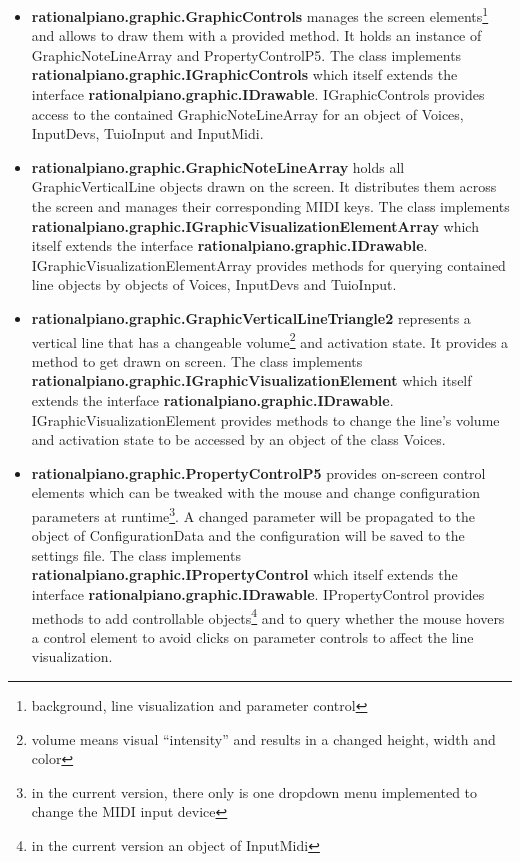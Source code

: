 \documentclass[12pt,a4paper,titlepage,oneside]{report}
\begin{document}
\begin{itemize}
	\item \textbf{rationalpiano.graphic.GraphicControls} manages the screen elements\footnote{background, line visualization and parameter control} and allows to draw them with a provided method. It holds an instance of GraphicNoteLineArray and PropertyControlP5. The class implements \textbf{rationalpiano.graphic.IGraphicControls} which itself extends the interface \textbf{rationalpiano.graphic.IDrawable}. IGraphicControls provides access to the contained GraphicNoteLineArray for an object of Voices, InputDevs, TuioInput and InputMidi.

	\item \textbf{rationalpiano.graphic.GraphicNoteLineArray} holds all GraphicVerticalLine objects drawn on the screen. It distributes them across the screen and manages their corresponding MIDI keys. The class implements \textbf{rationalpiano.graphic.IGraphicVisualizationElementArray} which itself extends the interface \textbf{rationalpiano.graphic.IDrawable}. IGraphicVisualizationElementArray provides methods for querying contained line objects by objects of Voices, InputDevs and TuioInput.

	\item \textbf{rationalpiano.graphic.GraphicVerticalLineTriangle2} represents a vertical line that has a changeable volume\footnote{volume means visual ``intensity'' and results in a changed height, width and color} and activation state. It provides a method to get drawn on screen. The class implements \textbf{rationalpiano.graphic.IGraphicVisualizationElement} which itself extends the interface \textbf{rationalpiano.graphic.IDrawable}. IGraphicVisualizationElement provides methods to change the line's volume and activation state to be accessed by an object of the class Voices.
	
	\item \textbf{rationalpiano.graphic.PropertyControlP5} provides on-screen control elements which can be tweaked with the mouse and change configuration parameters at runtime\footnote{in the current version, there only is one dropdown menu implemented to change the MIDI input device}. A changed parameter will be propagated to the object of ConfigurationData and the configuration will be saved to the settings file. The class implements \textbf{rationalpiano.graphic.IPropertyControl} which itself extends the interface \textbf{rationalpiano.graphic.IDrawable}. IPropertyControl provides methods to add controllable objects\footnote{in the current version an object of InputMidi} and to query whether the mouse hovers a control element to avoid clicks on parameter controls to affect the line visualization.
\end{itemize}
\end{document}
